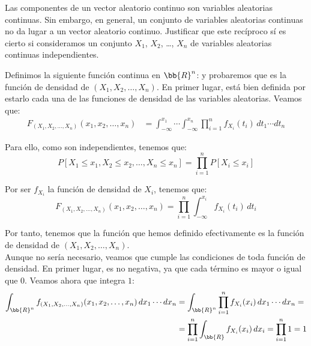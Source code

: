 \documentclass[12pt]{article}
\begin{document}
    \begin{ejercicio}[0.75 puntos]
        Las componentes de un vector aleatorio continuo son variables aleatorias continuas. Sin embargo, en general, un conjunto de variables aleatorias continuas no da lugar a un vector aleatorio continuo. Justificar que este recíproco sí es cierto si consideramos un conjunto $X_1$, $X_2$, \ldots, $X_n$ de variables aleatorias continuas independientes.

        Definimos la siguiente función continua en $\bb{R}^n$:
        y probaremos que es la función de densidad de $(X_1,X_2,\ldots,X_n)$. En primer lugar, está bien definida por estarlo cada una de las funciones de densidad de las variables aleatorias. Veamos que:
        \begin{align*}
            F_{(X_1,X_2,\ldots,X_n)}(x_1,x_2,\ldots,x_n) &= \int_{-\infty}^{x_1}\cdots\int_{-\infty}^{x_n} \prod\limits_{i=1}^n f_{X_i}(t_i) \,dt_1\cdots dt_n
        \end{align*}

        Para ello, como son independientes, tenemos que:
        \begin{equation*}
            P[X_1\leq x_1, X_2\leq x_2, \ldots, X_n\leq x_n] = \prod\limits_{i=1}^n P[X_i\leq x_i]
        \end{equation*}

        Por ser $f_{X_i}$ la función de densidad de $X_i$, tenemos que:
        \begin{equation*}
            F_{(X_1,X_2,\ldots,X_n)}(x_1,x_2,\ldots,x_n) = \prod\limits_{i=1}^n \int_{-\infty}^{x_i} f_{X_i}(t_i) \,dt_i
        \end{equation*}

        Por tanto, tenemos que la función que hemos definido efectivamente es la función de densidad de $(X_1,X_2,\ldots,X_n)$.\\

        Aunque no sería necesario, veamos que cumple las condiciones de toda función de densidad. En primer lugar, es no negativa, ya que cada término es mayor o igual que $0$. Veamos ahora que integra $1$:
        \begin{align*}
            \int_{\bb{R}^n} f_{(X_1,X_2,\ldots,X_n)}(x_1,x_2,\ldots,x_n) \,dx_1\cdots dx_n &= \int_{\bb{R}^n} \prod\limits_{i=1}^n f_{X_i}(x_i) \,dx_1\cdots dx_n
            =\\&= \prod\limits_{i=1}^n \int_{\bb{R}} f_{X_i}(x_i) \,dx_i
            = \prod\limits_{i=1}^n 1
            = 1
        \end{align*}
    \end{ejercicio}
\end{document}
